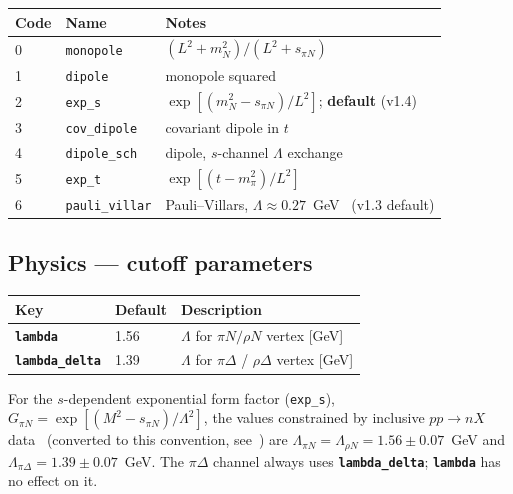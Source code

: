 \documentclass[11pt,a4paper]{article}
\newcommand{\inikey}[1]{\texttt{\textbf{#1}}}
\begin{document}
\begin{center}
\begin{tabular}{llp{7cm}}
\toprule
\textbf{Code} & \textbf{Name} & \textbf{Notes} \\
\midrule
0 & \texttt{monopole}    & $(L^2+m_N^2)/(L^2+s_{\pi N})$ \\
1 & \texttt{dipole}      & monopole squared \\
2 & \texttt{exp\_s}      & $\exp[(m_N^2-s_{\pi N})/L^2]$; \textbf{default} (v1.4) \\
3 & \texttt{cov\_dipole} & covariant dipole in $t$ \\
4 & \texttt{dipole\_sch} & dipole, $s$-channel $\Lambda$ exchange \\
5 & \texttt{exp\_t}      & $\exp[(t-m_\pi^2)/L^2]$ \\
6 & \texttt{pauli\_villar} & Pauli--Villars, $\Lambda\approx0.27$~GeV~\cite{McK16} (v1.3 default) \\
\bottomrule
\end{tabular}
\end{center}

\subsection{Physics --- cutoff parameters}

\begin{center}
\begin{tabular}{lll}
\toprule
\textbf{Key} & \textbf{Default} & \textbf{Description} \\
\midrule
\inikey{lambda}       & 1.56  & $\Lambda$ for $\pi N / \rho N$ vertex [GeV] \\
\inikey{lambda\_delta} & 1.39 & $\Lambda$ for $\pi\Delta$ / $\rho\Delta$ vertex [GeV] \\
\bottomrule
\end{tabular}
\end{center}

For the $s$-dependent exponential form factor (\texttt{exp\_s}),
$G_{\pi N}=\exp[(M^2-s_{\pi N})/\Lambda^2]$, the values constrained by
inclusive $pp\to nX$ data~\cite{HSS96} (converted to this convention,
see~\cite{TDIS15}) are $\Lambda_{\pi N}=\Lambda_{\rho N}=1.56\pm0.07$~GeV
and $\Lambda_{\pi\Delta}=1.39\pm0.07$~GeV.
The $\pi\Delta$ channel always uses \inikey{lambda\_delta};
\inikey{lambda} has no effect on it.
\end{document}
